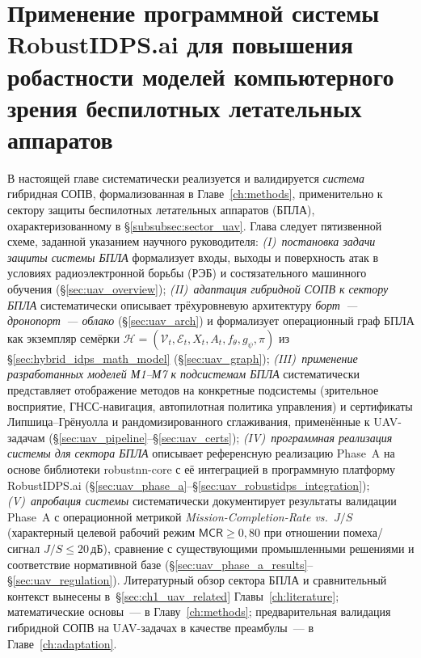 \chapter{Применение программной системы RobustIDPS.ai для повышения робастности моделей компьютерного зрения беспилотных летательных аппаратов}
\label{ch:uav}
В настоящей главе систематически реализуется и валидируется
\emph{система} гибридная СОПВ, формализованная в
Главе~\ref{ch:methods}, применительно к сектору защиты беспилотных
летательных аппаратов (БПЛА), охарактеризованному в
\S\ref{subsubsec:sector_uav}. Глава следует пятизвенной схеме,
заданной указанием научного руководителя:
\emph{(I)~постановка задачи защиты системы БПЛА} формализует
входы, выходы и поверхность атак в условиях радиоэлектронной
борьбы (РЭБ) и состязательного машинного обучения
(\S\ref{sec:uav_overview});
\emph{(II)~адаптация гибридной СОПВ к сектору БПЛА}
систематически описывает трёхуровневую архитектуру
\emph{борт~--- дронопорт~--- облако} (\S\ref{sec:uav_arch}) и
формализует операционный граф БПЛА как экземпляр семёрки
$\mathcal{H}=(\mathcal{V}_t, \mathcal{E}_t, X_t, A_t, f_\theta,
g_\psi, \pi)$ из \S\ref{sec:hybrid_idps_math_model}
(\S\ref{sec:uav_graph});
\emph{(III)~применение разработанных моделей М1--М7 к подсистемам
БПЛА} систематически представляет отображение методов на
конкретные подсистемы (зрительное восприятие, ГНСС-навигация,
автопилотная политика управления) и сертификаты
Липшица--Грёнуолла и рандомизированного сглаживания, применённые
к UAV-задачам
(\S\ref{sec:uav_pipeline}--\S\ref{sec:uav_certs});
\emph{(IV)~программная реализация системы для сектора БПЛА}
описывает референсную реализацию Phase~A на основе библиотеки
\textsf{robustnn-core} с её интеграцией в программную платформу
\textsf{RobustIDPS.ai}
(\S\ref{sec:uav_phase_a}--\S\ref{sec:uav_robustidps_integration});
\emph{(V)~апробация системы} систематически документирует
результаты валидации Phase~A с операционной метрикой
\emph{Mission-Completion-Rate vs.~$J/S$} (характерный целевой
рабочий режим $\textsf{MCR}\ge 0{,}80$ при отношении
помеха/сигнал $J/S \le 20\,$дБ), сравнение с существующими
промышленными решениями и соответствие нормативной базе
(\S\ref{sec:uav_phase_a_results}--\S\ref{sec:uav_regulation}).
Литературный обзор сектора БПЛА и сравнительный контекст
вынесены в~\S\ref{sec:ch1_uav_related} Главы~\ref{ch:literature};
математические основы~--- в Главу~\ref{ch:methods};
предварительная валидация гибридной СОПВ на UAV-задачах в
качестве преамбулы~--- в Главе~\ref{ch:adaptation}.
